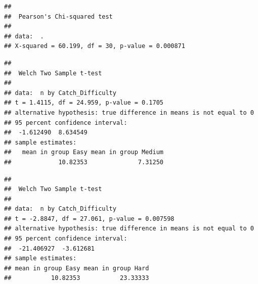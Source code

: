 \documentclass[]{article}
\newenvironment{Shaded}{\begin{snugshade}}{\end{snugshade}}
\newcommand{\KeywordTok}[1]{\textcolor[rgb]{0.13,0.29,0.53}{\textbf{#1}}}
\newcommand{\DataTypeTok}[1]{\textcolor[rgb]{0.13,0.29,0.53}{#1}}
\newcommand{\DecValTok}[1]{\textcolor[rgb]{0.00,0.00,0.81}{#1}}
\newcommand{\StringTok}[1]{\textcolor[rgb]{0.31,0.60,0.02}{#1}}
\newcommand{\CommentTok}[1]{\textcolor[rgb]{0.56,0.35,0.01}{\textit{#1}}}
\newcommand{\OperatorTok}[1]{\textcolor[rgb]{0.81,0.36,0.00}{\textbf{#1}}}
\newcommand{\NormalTok}[1]{#1}
\begin{document}
\begin{verbatim}
## 
##  Pearson's Chi-squared test
## 
## data:  .
## X-squared = 60.199, df = 30, p-value = 0.000871
\end{verbatim}

\begin{Shaded}
\end{Shaded}

\begin{verbatim}
## 
##  Welch Two Sample t-test
## 
## data:  n by Catch_Difficulty
## t = 1.4115, df = 24.959, p-value = 0.1705
## alternative hypothesis: true difference in means is not equal to 0
## 95 percent confidence interval:
##  -1.612490  8.634549
## sample estimates:
##   mean in group Easy mean in group Medium 
##             10.82353              7.31250
\end{verbatim}

\begin{Shaded}
\end{Shaded}

\begin{verbatim}
## 
##  Welch Two Sample t-test
## 
## data:  n by Catch_Difficulty
## t = -2.8847, df = 27.061, p-value = 0.007598
## alternative hypothesis: true difference in means is not equal to 0
## 95 percent confidence interval:
##  -21.406927  -3.612681
## sample estimates:
## mean in group Easy mean in group Hard 
##           10.82353           23.33333
\end{verbatim}
\end{document}
